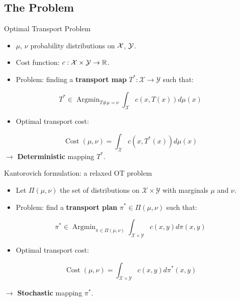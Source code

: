 \documentclass{beamer}
\newcommand{\R}{\mathbb{R}}
\DeclareMathOperator*{\Argmin}{\text{Argmin}}
\DeclareMathOperator*{\Cost}{\text{Cost}}
\begin{document}
\subsection{The Problem}
\begin{frame}{Optimal Transport Problem}
    \begin{itemize}
        \item $\mu$, $\nu$ probability distributions on ${\cal X}$, ${\cal Y}$.
        \item Cost function: $c:{\cal X}\times\mathcal{\cal Y}\to\R$.
        \item Problem: finding a \textbf{transport map} $T^*:\mathcal{X}\to \mathcal{Y}$ such that:
    \end{itemize}

    \begin{equation}
        T^* \in \Argmin_{T\#\mu=\nu} \int_{\mathcal{X}} c(x,T(x))d\mu(x)
    \end{equation}

    \begin{itemize}
        \item Optimal transport cost:
    \end{itemize}
    \begin{equation}
        \Cost(\mu,\nu) = \int_{\mathcal{X}} c(x,T^*(x))d\mu(x)
    \end{equation}
    $\rightarrow$ \textbf{Deterministic} mapping $T^*$.

\end{frame}

\begin{frame}{Kantorovich formulation: a relaxed OT problem}
    \begin{itemize}
        \item Let $\Pi(\mu,\nu)$ the set of distributions on $\mathcal{X}\times\mathcal{Y}$ with marginals $\mu$ and $\nu$.
        \item Problem: find a \textbf{transport plan} $\pi^*\in \Pi(\mu,\nu)$ such that:
    \end{itemize}
    \begin{equation}
        \pi^* \in \Argmin_{\pi\in\Pi(\mu,\nu)} \int_{\mathcal{X}\times\mathcal{Y}} c(x,y)d\pi(x,y)
    \end{equation}
    \begin{itemize}
        \item Optimal transport cost:
    \end{itemize}
    \begin{equation}
        \Cost(\mu,\nu) = \int_{\mathcal{X}\times\mathcal{Y}} c(x,y)d\pi^*(x,y)
    \end{equation}

    $\rightarrow$ \textbf{Stochastic} mapping $\pi^*$.
\end{frame}
\end{document}
